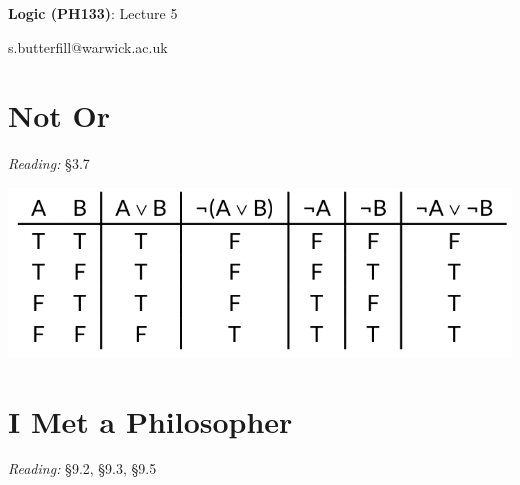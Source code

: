 \documentclass[12pt]{extarticle}
\date{}
\makeatletter
\def \ititle {Origins of Mind}
\def \isubtitle {Lecture 08}
\def \iemail{s.butterfill@warwick.ac.uk}
\makeatother
\begin{document}

\begin{multicols*}{3}

\setlength\footnotesep{1em}







\def \ititle {Logic (PH133)}
 
\def \isubtitle {Lecture 5}
 
\begin{center}
 
{\Large
 
\textbf{\ititle}: \isubtitle
 
}
 
 
 
\iemail %
 
\end{center}
 
 
 
 
\section{Not Or}
 
\emph{Reading:} §3.7
 
\begin{center}
\includegraphics[scale=0.3]{img/tt_unit_603.png}
\end{center}
 
 
\section{I Met a Philosopher}
 
\emph{Reading:} §9.2, §9.3, §9.5
 

\end{multicols*}
\end{document}
